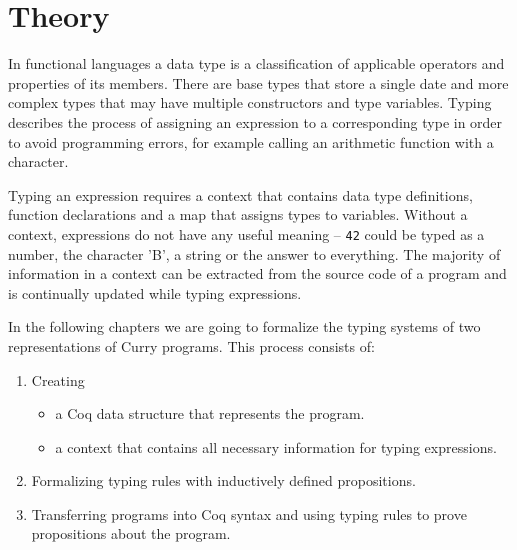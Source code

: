 \documentclass[paper = a4, fleqn, abstract=on, twoside]{scrreprt}
\newcommand{\coqinline}[1]{\texttt{#1}}
\begin{document}
\section{Theory}
\label{theory}
In functional languages a data type is a classification of applicable operators and properties of its members. There are base types that store a single date and more complex types that may have multiple constructors and type variables. Typing describes the process of assigning an expression to a corresponding type in order to avoid programming errors, for example calling an arithmetic function with a character.
\par
Typing an expression requires a context that contains data type definitions, function declarations and a map that assigns types to variables.  Without a context, expressions do not have any useful meaning -- \coqinline{42} could be typed as a number, the character 'B', a string or the answer to everything. The majority of information in a context can be extracted from the source code of a program and is continually updated while typing expressions.
\par
In the following chapters we are going to formalize the typing systems of two representations of Curry programs. This process consists of:
\begin{enumerate}
	\item Creating \begin{itemize}
		              \item a Coq data structure that represents the program.
		              \item a context that contains all necessary information for typing expressions.
		           \end{itemize}
	\item Formalizing typing rules with inductively defined propositions.
	\item Transferring programs into Coq syntax and using typing rules to prove propositions about the program.
\end{enumerate}
\end{document}
